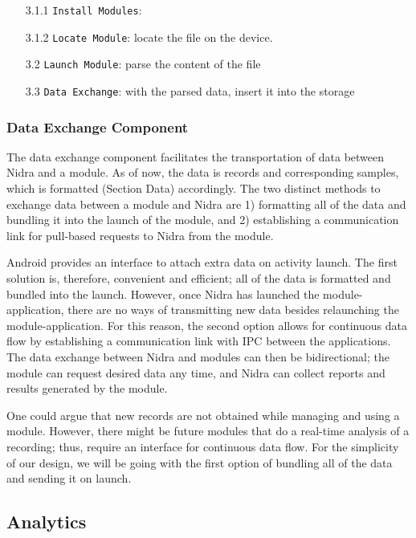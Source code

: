 \begin{itemize}
    \item[3.1.1] \verb|Install Modules|:
    \item[3.1.2] \verb|Locate Module|: locate the file on the device.
    \item[3.2] \verb|Launch Module|: parse the content of the file 
    \item[3.3] \verb|Data Exchange|: with the parsed data, insert it into the storage 
\end{itemize}

\subsubsection{Data Exchange Component}

The data exchange component facilitates the transportation of data between Nidra and a module. As of now, the data is records and corresponding samples, which is formatted (Section Data) accordingly. The two distinct methods to exchange data between a module and Nidra are 1) formatting all of the data and bundling it into the launch of the module, and 2) establishing a communication link for pull-based requests to Nidra from the module. 

Android provides an interface to attach extra data on activity launch. The first solution is, therefore, convenient and efficient; all of the data is formatted and bundled into the launch. However, once Nidra has launched the module-application, there are no ways of transmitting new data besides relaunching the module-application. For this reason, the second option allows for continuous data flow by establishing a communication link with IPC between the applications. The data exchange between Nidra and modules can then be bidirectional; the module can request desired data any time, and Nidra can collect reports and results generated by the module. 

One could argue that new records are not obtained while managing and using a module. However, there might be future modules that do a real-time analysis of a recording; thus, require an interface for continuous data flow. For the simplicity of our design, we will be going with the first option of bundling all of the data and sending it on launch.

\subsection{Analytics}

